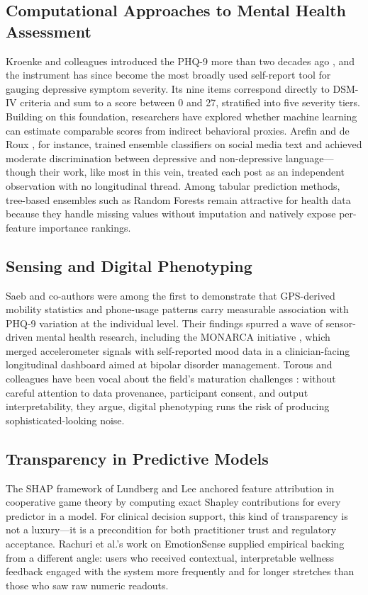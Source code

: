 \documentclass[conference]{IEEEtran}
\begin{document}
\subsection{Computational Approaches to Mental Health Assessment}
Kroenke and colleagues introduced the PHQ-9 more than two decades ago \cite{kroenke2001phq9}, and the instrument has since become the most broadly used self-report tool for gauging depressive symptom severity. Its nine items correspond directly to DSM-IV criteria and sum to a score between 0 and 27, stratified into five severity tiers. Building on this foundation, researchers have explored whether machine learning can estimate comparable scores from indirect behavioral proxies. Arefin and de Roux \cite{arefin2020machine}, for instance, trained ensemble classifiers on social media text and achieved moderate discrimination between depressive and non-depressive language---though their work, like most in this vein, treated each post as an independent observation with no longitudinal thread. Among tabular prediction methods, tree-based ensembles such as Random Forests \cite{breiman2001random} remain attractive for health data because they handle missing values without imputation and natively expose per-feature importance rankings.

\subsection{Sensing and Digital Phenotyping}
Saeb and co-authors \cite{saeb2015mobile} were among the first to demonstrate that GPS-derived mobility statistics and phone-usage patterns carry measurable association with PHQ-9 variation at the individual level. Their findings spurred a wave of sensor-driven mental health research, including the MONARCA initiative \cite{bardram2020designing}, which merged accelerometer signals with self-reported mood data in a clinician-facing longitudinal dashboard aimed at bipolar disorder management. Torous and colleagues have been vocal about the field's maturation challenges \cite{torous2019digital, torous2021digital}: without careful attention to data provenance, participant consent, and output interpretability, they argue, digital phenotyping runs the risk of producing sophisticated-looking noise.

\subsection{Transparency in Predictive Models}
The SHAP framework of Lundberg and Lee \cite{lundberg2017shap} anchored feature attribution in cooperative game theory by computing exact Shapley contributions for every predictor in a model. For clinical decision support, this kind of transparency is not a luxury---it is a precondition for both practitioner trust and regulatory acceptance. Rachuri et al.'s work on EmotionSense \cite{rachuri2010emotionsense} supplied empirical backing from a different angle: users who received contextual, interpretable wellness feedback engaged with the system more frequently and for longer stretches than those who saw raw numeric readouts.
\end{document}
